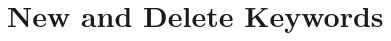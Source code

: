 \documentclass[oops.tex]{subfiles}
\begin{document}
\section{New and Delete Keywords}
\end{document}
